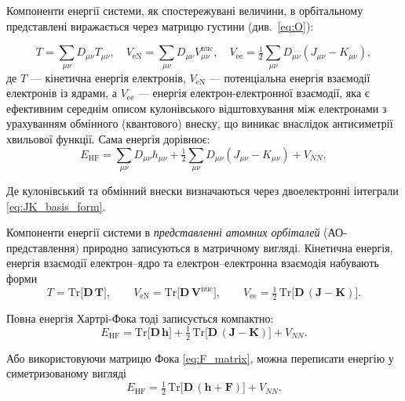 Компоненти енергії системи, як спостережувані величини, в орбітальному представлені виражається через матрицю густини (див.~\eqref{eq:O}):

\begin{equation*}
	T = \sum_{\mu\nu} D_{\mu\nu} T_{\mu\nu}, \quad
	V_\text{eN} = \sum_{\mu\nu} D_{\mu\nu} V_{\mu\nu}^{\text{nuc}}, \quad
	V_{\text{ee}} = \tfrac{1}{2} \sum_{\mu\nu} D_{\mu\nu} \left( J_{\mu\nu} - K_{\mu\nu} \right),
\end{equation*}
де $T$ --- кінетична енергія електронів,  $V_\text{eN}$ --- потенціальна енергія взаємодії електронів із ядрами,  а $V_{\text{ee}}$ --- енергія електрон-електронної взаємодії,  яка є ефективним середнім описом кулонівського відштовхування між електронами  з урахуванням обмінного (квантового) внеску, що виникає внаслідок антисиметрії хвильової функції. Сама енергія дорівнює:
\begin{equation}\label{eq:EHForbilal_repr}
	E_{\text{HF}}
	= \sum_{\mu\nu} D_{\mu\nu} h_{\mu\nu}
	+ \tfrac{1}{2} \sum_{\mu\nu} D_{\mu\nu} \left( J_{\mu\nu} - K_{\mu\nu} \right)
	+ V_{NN},
\end{equation}

Де кулонівський та обмінний внески визначаються через двоелектронні інтеграли \eqref{eq:JK_basis_form}.

Компоненти енергії системи в \emph{представленні атомних орбіталей} (АО-представлення) природно записуються в матричному вигляді. Кінетична енергія, енергія взаємодії електрон–ядро та електрон–електронна взаємодія набувають форми
\begin{equation*}
	T = \mathrm{Tr} \big[\mathbf{D}\,\mathbf{T}\big],
	\qquad
	V_{\mathrm{eN}} = \mathrm{Tr} \big[\mathbf{D}\,\mathbf{V}^{\mathrm{nuc}}\big],
	\qquad
	V_{\mathrm{ee}}=\tfrac{1}{2}\,\mathrm{Tr} \big[\mathbf{D}\,(\mathbf{J}-\mathbf{K})\big].
\end{equation*}

Повна енергія Хартрі-Фока тоді записується компактно:
\begin{equation}\label{eq:E_HF_matrix_form_hJK}
	E_{\mathrm{HF}}
	=
	\mathrm{Tr} \big[\mathbf{D}\,\mathbf{h}\big]
	+
	\tfrac{1}{2}\,\mathrm{Tr} \big[\mathbf{D}\,(\mathbf{J}-\mathbf{K})\big]
	+
	V_{NN}.
\end{equation}

Або використовуючи матрицю Фока \eqref{eq:F_matrix}, можна переписати енергію у симетризованому вигляді
\begin{equation}\label{eq:E_HF_matrix_form_hF}
	E_{\text{HF}}
	=
	\tfrac{1}{2}\,\mathrm{Tr} \big[\mathbf{D}\,(\mathbf{h}+\mathbf{F})\big]
	+
	V_{NN}.
\end{equation}

